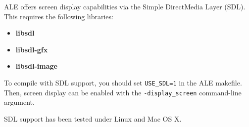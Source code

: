\documentclass[12pt]{article}
\begin{document}
ALE offers screen display capabilities via the Simple DirectMedia Layer (SDL). This requires
the following libraries:

\begin{itemize}
  \item{\textbf{libsdl}}
  \item{\textbf{libsdl-gfx}}
  \item{\textbf{libsdl-image}}
\end{itemize}

To compile with SDL support, you should set \verb+USE_SDL=1+ in the ALE makefile. Then, screen
display can be enabled with the \verb+-display_screen+ command-line argument. 

SDL support has been tested under Linux and Mac OS X. 
\end{document}
